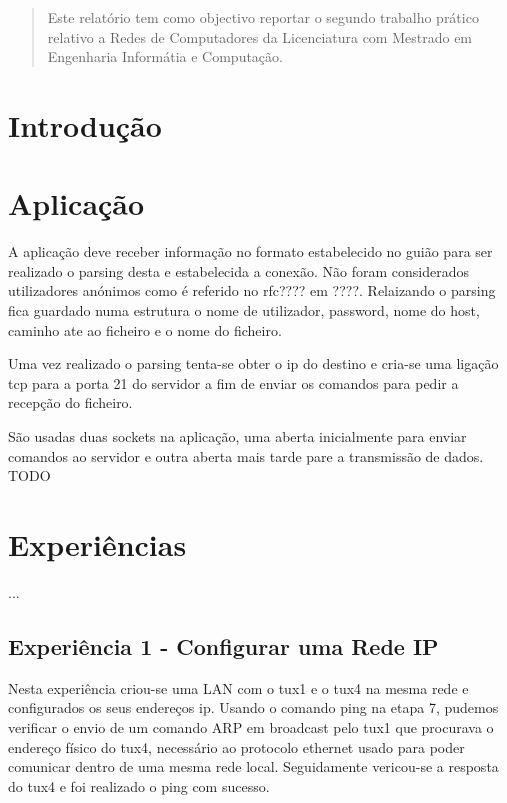\documentclass[11pt,a4paper,reqno]{report}
\numberwithin{equation}{section}
\begin{document}



\begin{abstract}
	
Este relatório tem como objectivo reportar o segundo trabalho prático relativo a Redes de Computadores da Licenciatura com Mestrado em Engenharia Informátia e Computação. 


\end{abstract}

\tableofcontents

\chapter{Introdução}


	
\chapter{Aplicação}

A aplicação deve receber informação no formato estabelecido no guião para ser realizado o parsing desta e estabelecida a conexão. Não foram considerados utilizadores anónimos como é referido no rfc???? em ????. Relaizando o parsing fica guardado numa estrutura o nome de utilizador, password, nome do host, caminho ate ao ficheiro e o nome do ficheiro.

Uma vez realizado o parsing tenta-se obter o ip do destino e cria-se uma ligação tcp para a porta 21 do servidor a fim de enviar os comandos para pedir a recepção do ficheiro.

São usadas duas sockets na aplicação, uma aberta inicialmente para enviar comandos ao servidor e outra aberta mais tarde pare a transmissão de dados. 
TODO

\chapter{Experiências}
...
\section{Experiência 1 - Configurar uma Rede IP}

Nesta experiência criou-se uma LAN com o tux1 e o tux4 na mesma rede e configurados os seus endereços ip. Usando o comando ping na etapa 7, pudemos verificar o envio de um comando ARP em broadcast pelo tux1 que procurava o endereço físico do tux4, necessário ao protocolo ethernet usado para poder comunicar dentro de uma mesma rede local. Seguidamente vericou-se a resposta do tux4 e foi realizado o ping com sucesso.
\end{document}
